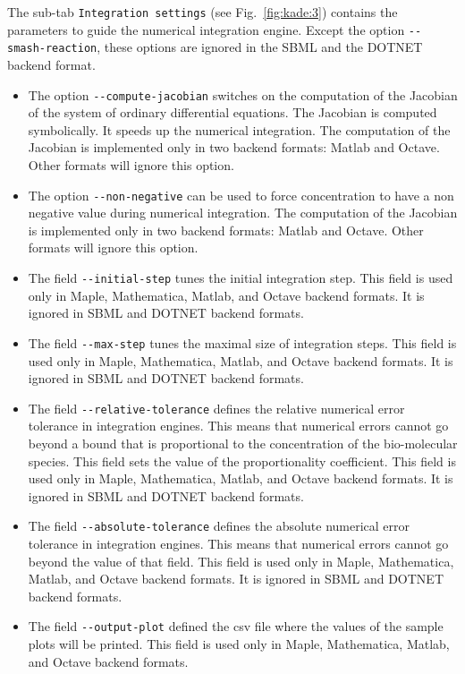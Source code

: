 \documentclass[11pt]{book}
\begin{document}
The sub-tab \texttt{Integration settings} (see Fig.~\ref{fig:kade:3}) contains the parameters to guide the numerical integration engine. Except the option \texttt{-{}-smash-reaction}, these options are ignored in the SBML and the
DOTNET backend format.

\begin{itemize}
  \item The option \texttt{-{}-compute-jacobian} switches on the computation of the Jacobian of the system of ordinary differential equations.
  The Jacobian is computed symbolically. It speeds up the numerical integration. The computation of the Jacobian is implemented only in two backend formats:  Matlab and Octave. Other formats will ignore this option.
  \item The option \texttt{-{}-non-negative} can be used to force concentration to have a non negative value during numerical integration.
  The computation of the Jacobian is implemented only in two backend formats:  Matlab and Octave. Other formats will ignore this option.
  \item The field \texttt{-{}-initial-step} tunes the initial integration step.
  This field is used only in Maple, Mathematica, Matlab, and Octave backend formats.
  It is ignored in SBML and DOTNET backend formats.
  \item The field \texttt{-{}-max-step} tunes the maximal size of integration steps. This field is used only in Maple, Mathematica, Matlab, and Octave backend formats.
  It is ignored in SBML and DOTNET backend formats.
  \item The field \texttt{-{}-relative-tolerance} defines the relative numerical error tolerance in integration engines. This means that numerical errors cannot go beyond a bound that is proportional to the concentration of the bio-molecular species. This field sets the value of the proportionality coefficient.   This field is used only in Maple, Mathematica, Matlab, and Octave backend formats.
  It is ignored in SBML and DOTNET backend formats.
  \item The field \texttt{-{}-absolute-tolerance} defines the absolute numerical error tolerance in integration engines. This means that numerical errors cannot go beyond the value of that field.  This field is used only in Maple, Mathematica, Matlab, and Octave backend formats. It is ignored in SBML and DOTNET backend formats.
  \item The field \texttt{-{}-output-plot} defined the csv file where the values of the sample plots will be printed. This field is used only in Maple, Mathematica, Matlab, and Octave backend formats.

\end{itemize}
\end{document}
